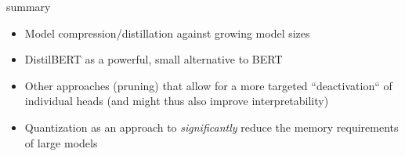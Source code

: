 
\begin{frame}{summary}

\vfill

\begin{itemize}
	\item Model compression/distillation against growing model sizes
	\item DistilBERT as a powerful, small alternative to BERT
	\item Other approaches (pruning) that allow for a more targeted ``deactivation`` of individual heads (and might thus also improve interpretability)
	\item Quantization as an approach to \textit{significantly} reduce the memory requirements of large models
\end{itemize}

\vfill
	
\end{frame}


\endlecture

